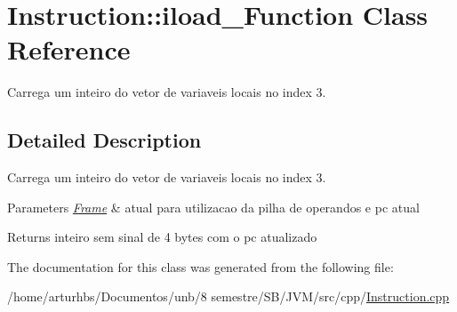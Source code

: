 \hypertarget{classInstruction_1_1iload__3Function}{}\section{Instruction\+:\+:iload\+\_\+Function Class Reference}
\label{classInstruction_1_1iload__3Function}


Carrega um inteiro do vetor de variaveis locais no index 3.  




\subsection{Detailed Description}
Carrega um inteiro do vetor de variaveis locais no index 3. 


\begin{DoxyParams}{Parameters}
{\em \hyperlink{classFrame}{Frame}} & atual para utilizacao da pilha de operandos e pc atual \\
\hline
\end{DoxyParams}
\begin{DoxyReturn}{Returns}
inteiro sem sinal de 4 bytes com o pc atualizado 
\end{DoxyReturn}


The documentation for this class was generated from the following file\+:\begin{DoxyCompactItemize}
\item 
/home/arturhbs/\+Documentos/unb/8 semestre/\+S\+B/\+J\+V\+M/src/cpp/\hyperlink{Instruction_8cpp}{Instruction.\+cpp}\end{DoxyCompactItemize}
